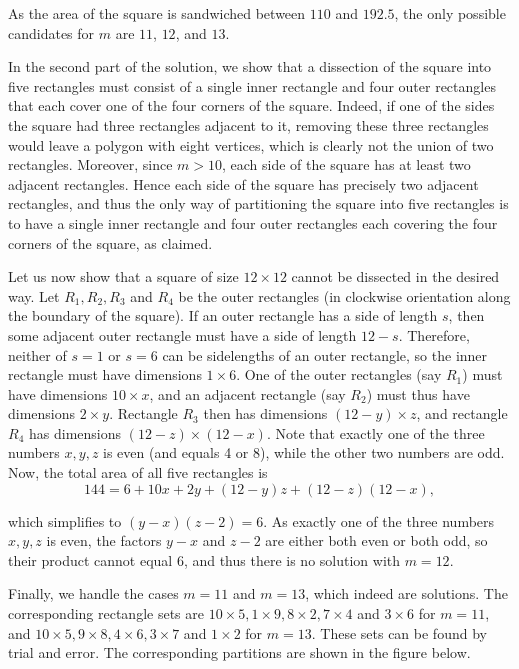 \documentclass[a4paper, 12pt]{article}
\begin{document}
\begin{enumerate}
As the area of the square is sandwiched between $110$ and $192.5$, the only possible candidates for $m$ are $11$, $12$, and $13$.

In the second part of the solution, we show that a dissection of the square into five rectangles must consist of a single inner rectangle and four outer rectangles that each cover one of the four corners of the square. Indeed, if one of the sides the square had three rectangles adjacent to it, removing these three rectangles would leave a polygon with eight vertices, which is clearly not the union of two rectangles. Moreover, since $m > 10$, each side of the square has at least two adjacent rectangles. Hence each side of the square has precisely two adjacent rectangles, and thus the only way of partitioning the square into five rectangles is to have a single inner rectangle and four outer rectangles each covering the four corners of the square, as claimed.

Let us now show that a square of size $12 \times 12$ cannot be dissected in the desired way. Let $R_1, R_2, R_3$ and $R_4$ be the outer rectangles (in clockwise orientation along the boundary of the square). If an outer rectangle has a side of length $s$, then some adjacent outer rectangle must have a side of length $12 − s$. Therefore, neither of $s = 1$ or $s = 6$ can be sidelengths of an outer rectangle, so the inner rectangle must have dimensions $1 \times 6$. One of the outer rectangles (say $R_1$) must have dimensions $10 \times x$, and an adjacent rectangle (say $R_2$) must thus have dimensions $2 \times y$. Rectangle $R_3$ then has dimensions $(12 − y) \times z$, and rectangle $R_4$ has dimensions $(12 - z) \times (12 - x)$. Note that exactly one of the three numbers $x, y, z$ is even (and equals 4 or 8), while the other two numbers are odd. Now, the total area of all five rectangles is
$$ 144 = 6 + 10x + 2y + (12 - y) z + (12 - z)(12 - x), $$

which simplifies to $(y - x)(z - 2) = 6$. As exactly one of the three numbers $x, y, z$ is even, the factors $y - x$ and $z - 2$ are either both even or both odd, so their product cannot equal 6, and thus there is no solution with $m = 12$.

Finally, we handle the cases $m = 11$ and $m = 13$, which indeed are solutions. The corresponding rectangle sets are $10 \times 5, 1 \times 9, 8 \times 2, 7 \times 4$ and $3 \times 6$ for $m = 11$, and $10 \times 5, 9 \times 8, 4 \times 6, 3 \times 7$ and $1 \times 2$ for $m = 13$. These sets can be found by trial and error. The corresponding partitions are shown in the figure below.


\end{enumerate}
\end{document}
